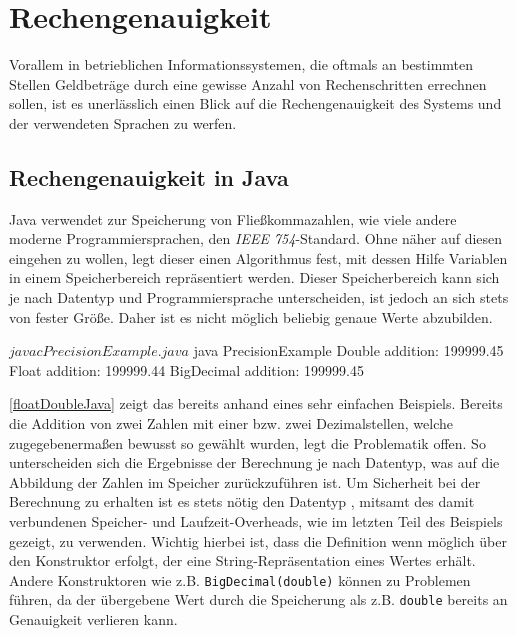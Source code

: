 \section{Rechengenauigkeit}
Vorallem in betrieblichen Informationssystemen, die oftmals an bestimmten Stellen Geldbeträge durch eine gewisse Anzahl von Rechenschritten errechnen sollen, ist es unerlässlich einen Blick auf die Rechengenauigkeit des Systems und der verwendeten Sprachen zu werfen.

\subsection*{Rechengenauigkeit in Java}
Java verwendet zur Speicherung von Fließkommazahlen, wie viele andere moderne Programmiersprachen, den \textit{IEEE 754}-Standard. Ohne näher auf diesen eingehen zu wollen, legt dieser einen Algorithmus fest, mit dessen Hilfe Variablen in einem Speicherbereich repräsentiert werden. Dieser Speicherbereich kann sich je nach Datentyp und Programmiersprache unterscheiden, ist jedoch an sich stets von fester Größe. Daher ist es nicht möglich beliebig genaue Werte abzubilden. 

\sepCodeAndOutputCheck
\begin{shellwindow}
$ javac PrecisionExample.java 
$ java PrecisionExample
Double addition: 199999.45
Float addition: 199999.44
BigDecimal addition: 199999.45
\end{shellwindow}

\autoref{floatDoubleJava} zeigt das bereits anhand eines sehr einfachen Beispiels. Bereits die Addition von zwei Zahlen mit einer bzw. zwei Dezimalstellen, welche zugegebenermaßen bewusst so gewählt wurden, legt die Problematik offen. So unterscheiden sich die Ergebnisse der Berechnung je nach Datentyp, was auf die Abbildung der Zahlen im Speicher zurückzuführen ist. Um Sicherheit bei der Berechnung zu erhalten ist es stets nötig den Datentyp , mitsamt des damit verbundenen Speicher- und Laufzeit-Overheads, wie im letzten Teil des Beispiels gezeigt, zu verwenden. Wichtig hierbei ist, dass die Definition wenn möglich über den Konstruktor erfolgt, der eine String-Repräsentation eines Wertes erhält. Andere Konstruktoren wie z.B. \texttt{BigDecimal(double)} können zu Problemen führen, da der übergebene Wert durch die Speicherung als z.B. \texttt{double} bereits an Genauigkeit verlieren kann.

